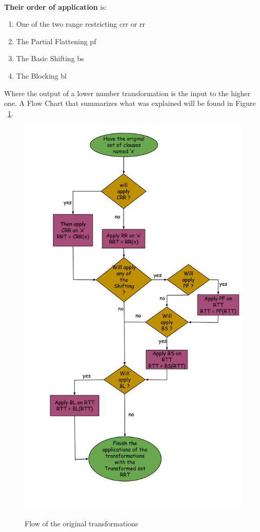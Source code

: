 		\paragraph{} \textbf{Their order of application} is:
			\begin{enumerate}
				\item One of the two range restricting \ac{crr} or \ac{rr}
				\item The Partial Flattening \ac{pf}
				\item The Basic Shifting \ac{bs}
				\item The Blocking \ac{bl} 
			\end{enumerate}			 
		Where the output of a lower number transformation is the input to the higher one. A Flow Chart that summarizes what was explained will be found in Figure ~\ref{fig:original_transformations_flow}.
		
		\begin{figure}[H]
			\centering
 		 	\scalebox{0.38}
 			{\includegraphics{pictures/Original_transformations_flow.png}}
 			\caption{Flow of the original transformations}\label{fig:original_transformations_flow}
		\end{figure}
